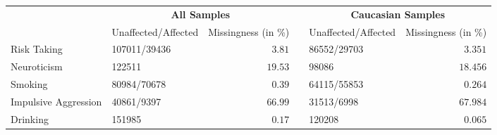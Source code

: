 \begin{tabular}{llrclr}
\hline\hline
\multicolumn{1}{l}{\bfseries }&\multicolumn{2}{c}{\bfseries All Samples}&\multicolumn{1}{c}{\bfseries }&\multicolumn{2}{c}{\bfseries Caucasian Samples}\tabularnewline
\cline{2-3} \cline{5-6}
\multicolumn{1}{l}{}&\multicolumn{1}{c}{Unaffected/Affected}&\multicolumn{1}{c}{Missingness (in \%)}&\multicolumn{1}{c}{}&\multicolumn{1}{c}{Unaffected/Affected}&\multicolumn{1}{c}{Missingness (in \%)}\tabularnewline
\hline
Risk Taking&107011/39436&$ 3.81$&&86552/29703&$ 3.351$\tabularnewline
Neuroticism&122511&$19.53$&&98086&$18.456$\tabularnewline
Smoking&80984/70678&$ 0.39$&&64115/55853&$ 0.264$\tabularnewline
Impulsive Aggression&40861/9397&$66.99$&&31513/6998&$67.984$\tabularnewline
Drinking&151985&$ 0.17$&&120208&$ 0.065$\tabularnewline
\hline
\end{tabular}

